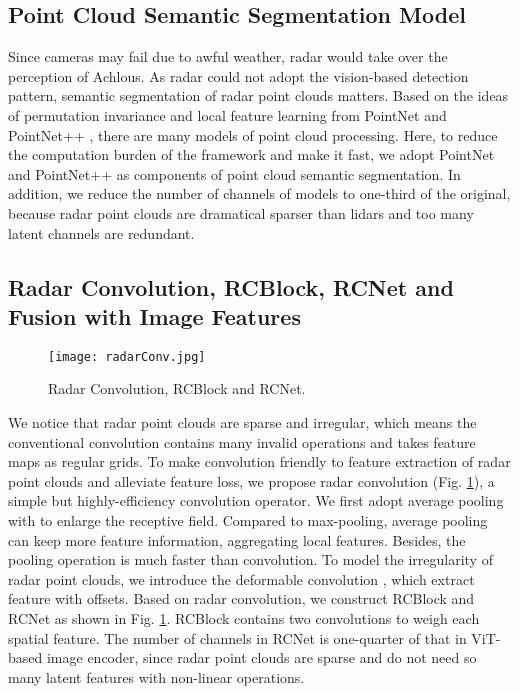 \documentclass[letterpaper, 10 pt, conference]{ieeeconf}
\begin{document}
\subsection{Point Cloud Semantic Segmentation Model}
Since cameras may fail due to awful weather, radar would take over the perception of Achlous. As radar could not adopt the vision-based detection pattern, semantic segmentation of radar point clouds matters. Based on the ideas of permutation invariance and local feature learning from PointNet \cite{Charles_Su_Kaichun_Guibas_2017} and PointNet++ \cite{Qi_Yi_Su_Guibas_2017}, there are many models of point cloud processing. Here, to reduce the computation burden of the framework and make it fast, we adopt PointNet and PointNet++ as components of point cloud semantic segmentation. In addition, we reduce the number of channels of models to one-third of the original, because radar point clouds are dramatical sparser than lidars and too many latent channels are redundant.

\subsection{Radar Convolution, RCBlock, RCNet and Fusion with Image Features}
\label{subsec:rcnet}

\begin{figure}
    \centering
    \texttt{[image: radarConv.jpg]}
    \caption{Radar Convolution, RCBlock and RCNet.}
    \label{fig:radarConv}
\end{figure}

We notice that radar point clouds are sparse and irregular, which means the conventional convolution contains many invalid operations and takes feature maps as regular grids. To make convolution friendly to feature extraction of radar point clouds and alleviate feature loss, we propose radar convolution (Fig. \ref{fig:radarConv}), a simple but highly-efficiency convolution operator. We first adopt average pooling with  to enlarge the receptive field. Compared to max-pooling, average pooling can keep more feature information, aggregating local features. Besides, the pooling operation is much faster than convolution. To model the irregularity of radar point clouds, we introduce the deformable convolution \cite{zhu2019deformable}, which extract feature with offsets. Based on radar convolution, we construct RCBlock and RCNet as shown in Fig. \ref{fig:radarConv}. RCBlock contains two  convolutions to weigh each spatial feature. The number of channels in RCNet is one-quarter of that in ViT-based image encoder, since radar point clouds are sparse and do not need so many latent features with non-linear operations. 
\end{document}
